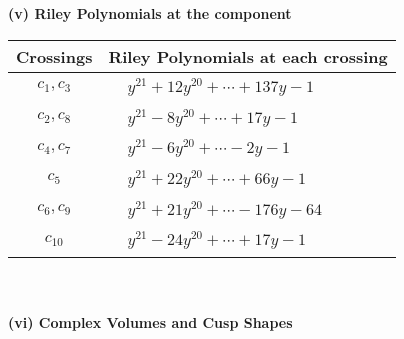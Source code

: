 \documentclass[1p]{elsarticle_modified}
\theoremstyle{definition}
\begin{document}
\newpage\renewcommand{\arraystretch}{1}
\flushleft \textbf{(v) Riley Polynomials at the component}\newline \\
\begin{tabular}{m{50pt}|m{274pt}}
Crossings & \hspace{64pt}Riley Polynomials at each crossing \\
\hline $$\begin{aligned}c_{1},c_{3}\end{aligned}$$&$\begin{aligned}
&y^{21}+12 y^{20}+\cdots+137 y-1
\end{aligned}$\\
\hline $$\begin{aligned}c_{2},c_{8}\end{aligned}$$&$\begin{aligned}
&y^{21}-8 y^{20}+\cdots+17 y-1
\end{aligned}$\\
\hline $$\begin{aligned}c_{4},c_{7}\end{aligned}$$&$\begin{aligned}
&y^{21}-6 y^{20}+\cdots-2 y-1
\end{aligned}$\\
\hline $$\begin{aligned}c_{5}\end{aligned}$$&$\begin{aligned}
&y^{21}+22 y^{20}+\cdots+66 y-1
\end{aligned}$\\
\hline $$\begin{aligned}c_{6},c_{9}\end{aligned}$$&$\begin{aligned}
&y^{21}+21 y^{20}+\cdots-176 y-64
\end{aligned}$\\
\hline $$\begin{aligned}c_{10}\end{aligned}$$&$\begin{aligned}
&y^{21}-24 y^{20}+\cdots+17 y-1
\end{aligned}$\\
\hline
\end{tabular}\\~\\
\newpage\flushleft \textbf{(vi) Complex Volumes and Cusp Shapes}
\end{document}
